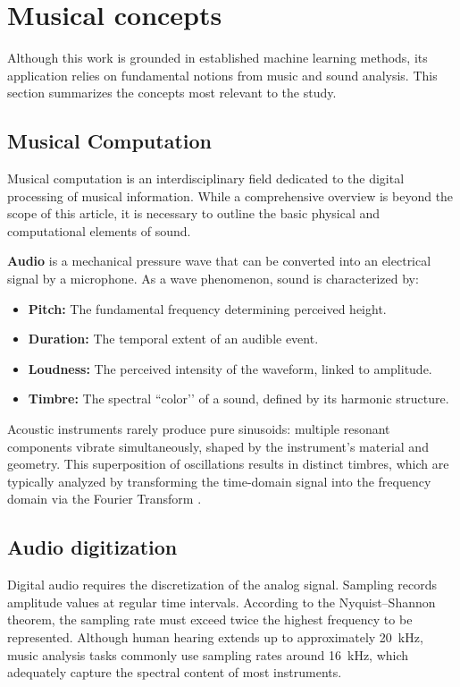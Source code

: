 \documentclass[10pt,conference]{IEEEtran}
\begin{document}
\section{Musical concepts} \label{sec:fund} 

Although this work is grounded in established machine learning methods, its application relies on fundamental notions from music and sound analysis. This section summarizes the concepts most relevant to the study.

\subsection{Musical Computation}

Musical computation is an interdisciplinary field dedicated to the digital processing of musical information. While a comprehensive overview is beyond the scope of this article, it is necessary to outline the basic physical and computational elements of sound.

\textbf{Audio} is a mechanical pressure wave that can be converted into an electrical signal by a microphone. As a wave phenomenon, sound is characterized by:

\begin{itemize}
    \item \textbf{Pitch:} The fundamental frequency determining perceived height.
    \item \textbf{Duration:} The temporal extent of an audible event.
    \item \textbf{Loudness:} The perceived intensity of the waveform, linked to amplitude.
    \item \textbf{Timbre:} The spectral “color’’ of a sound, defined by its harmonic structure.
\end{itemize}

Acoustic instruments rarely produce pure sinusoids: multiple resonant components vibrate simultaneously, shaped by the instrument’s material and geometry. This superposition of oscillations results in distinct timbres, which are typically analyzed by transforming the time-domain signal into the frequency domain via the Fourier Transform \cite{benson2008music}.

\subsection{Audio digitization}

Digital audio requires the discretization of the analog signal. Sampling \cite{po2022sampling} records amplitude values at regular time intervals. According to the Nyquist–Shannon theorem, the sampling rate must exceed twice the highest frequency to be represented. Although human hearing extends up to approximately 20~kHz, music analysis tasks commonly use sampling rates around 16~kHz, which adequately capture the spectral content of most instruments.
\end{document}
